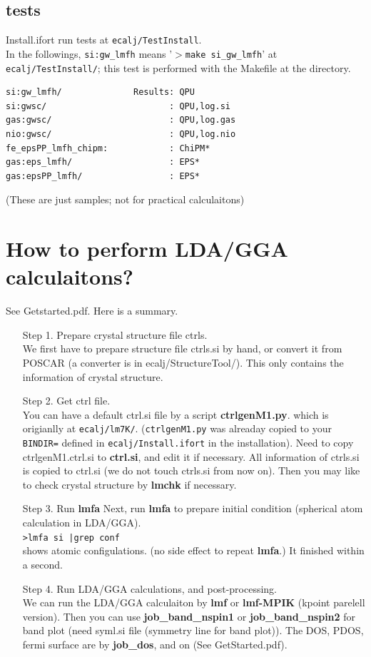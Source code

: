 \documentclass[a4paper,10pt,epsf,fleqn]{article}
\newcommand{\exe}[1]{{\bf #1}}
\newcommand{\io}[1]{{\sf  #1}}
\begin{document}
\subsection{tests}
Install.ifort run tests at \verb#ecalj/TestInstall#.\\
In the followings, \verb#si:gw_lmfh# means '$>$\verb#make si_gw_lmfh#'
at \verb#ecalj/TestInstall/#; this test is performed with the Makefile
at the directory. 
\begin{verbatim}
si:gw_lmfh/              Results: QPU 
si:gwsc/                        : QPU,log.si
gas:gwsc/                       : QPU,log.gas
nio:gwsc/                       : QPU,log.nio
fe_epsPP_lmfh_chipm:            : ChiPM* 
gas:eps_lmfh/                   : EPS*
gas:epsPP_lmfh/                 : EPS*
\end{verbatim}
(These are just samples; not for practical calculaitons)


\newpage
\section{How to perform LDA/GGA calculaitons?}
\label{lda}
See Getstarted.pdf. Here is a summary.
\begin{enumerate}
\item[Step 1.] Prepare crystal structure file \io{ctrls}.\\
We first have to prepare structure file \io{ctrls.si} by hand,
or convert it from POSCAR (a converter is in \io{ecalj/StructureTool/}).
This only contains the information of crystal structure.
\item[Step 2.] Get \io{ctrl} file.\\
You can have a default \io{ctrl.si} file by a script \exe{ctrlgenM1.py}.
which is origianlly at \verb#ecalj/lm7K/#.
(\verb#ctrlgenM1.py# was alreaday copied to your 
{\tt BINDIR=} defined in {\tt ecalj/Install.ifort} in the installation).
Need to copy \io{ctrlgenM1.ctrl.si} to \exe{ctrl.si}, and edit it if necessary.
All information of \io{ctrls.si} is copied to \io{ctrl.si}
(we do not touch ctrls.si from now on).
Then you may like to check crystal structure by \exe{lmchk} if necessary.
\item[Step 3.] Run \exe{lmfa}
Next, run \exe{lmfa} to prepare initial condition 
(spherical atom calculation in LDA/GGA).\\
\verb#>lmfa si |grep conf#\\
shows atomic configulations. (no side effect to repeat \exe{lmfa}.)
It finished within a second.
\item[Step 4.] Run LDA/GGA calculations, and post-processing.\\
We can run the LDA/GGA calculaiton by \exe{lmf} or \exe{lmf-MPIK}
	     (kpoint parelell version).
Then you can use \exe{job\_band\_nspin1} or \exe{job\_band\_nspin2} for 
band plot (need \io{syml.si} file (symmetry line for band plot)).
The DOS, PDOS, fermi surface are by \exe{job\_dos}, and on (See GetStarted.pdf).
\end{enumerate}
\end{document}
